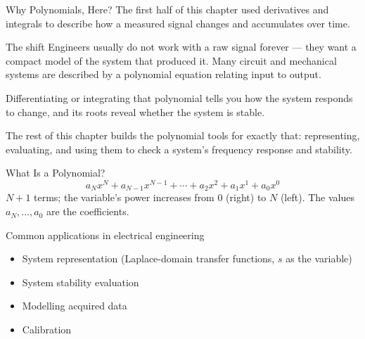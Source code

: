 \documentclass[9pt,aspectratio=169,xcolor=table]{beamer}
\begin{document}
\begin{frame}{Why Polynomials, Here?}
    \leavevmode
    The first half of this chapter used derivatives and integrals to
    describe how a \alert{measured signal} changes and accumulates over
    time.

    \vspace{3mm}
    \begin{alertblock}{The shift}
        Engineers usually do not work with a raw signal forever ---
        they want a compact \alert{model} of the system that produced
        it. Many circuit and mechanical systems are described by a
        polynomial equation relating input to output.
    \end{alertblock}

    \vspace{3mm}
    Differentiating or integrating that polynomial tells you how the
    system responds to change, and its \alert{roots} reveal whether the
    system is stable.

    \vspace{2mm}
    {\small The rest of this chapter builds the polynomial tools for
    exactly that: representing, evaluating, and using them to check a
    system's frequency response and stability.}
\end{frame}

\begin{frame}{What Is a Polynomial?}
    \leavevmode
    \[
    a_N x^N + a_{N-1} x^{N-1} + \cdots + a_2 x^2 + a_1 x^1 + a_0 x^0
    \]
    $N+1$ terms; the variable's power increases from $0$ (right) to $N$
    (left). The values $a_N, \ldots, a_0$ are the \alert{coefficients}.

    \vspace{3mm}
    \begin{block}{Common applications in electrical engineering}
        \small
        \begin{itemize}
            \item System representation (Laplace-domain transfer
                  functions, $s$ as the variable)
            \item System stability evaluation
            \item Modelling acquired data
            \item Calibration
        \end{itemize}
    \end{block}
\end{frame}
\end{document}
